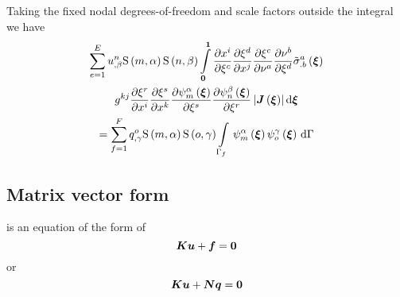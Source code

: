 Taking the fixed nodal degrees-of-freedom and scale factors outside the integral we have
\begin{multline}
  \dsum_{e=1}^{E}\nodedof{u}{n}{\beta}\gsf{m}{\alpha}\gsf{n}{\beta}
  \dintl{\vectr{0}}{\vectr{1}}\delby{x^{i}}{\xi^{c}}
  \delby{\xi^{d}}{x^{j}}\delby{\xi^{c}}{\nu^{a}}
  \delby{\nu^{b}}{\xi^{d}}\fnof{{\tilde{\conductivitytensorsymbol}}^{a}_{.b}}{\vectr{\xi}} \\
  \generalmetrictensorsymbol^{kj}\delby{\xi^{r}}{x^{i}}\delby{\xi^{s}}{x^{k}}
  \delby{\gbfn{m}{\alpha}{\vectr{\xi}}}{\xi^{s}}
  \delby{\gbfn{n}{\beta}{\vectr{\xi}}}{\xi^{r}}
  \abs{\fnof{\matr{J}}{\vectr{\xi}}}\exteriorderiv{\vectr{\xi}} \\
  = \dsum_{f=1}^{F}\nodedof{q}{o}{\gamma}\gsf{m}{\alpha}\gsf{o}{\gamma}
  \gint{\Gamma_{f}}{}{\gbfn{m}{\alpha}{\vectr{\xi}}\gbfn{o}{\gamma}{\vectr{\xi}}}{\Gamma}
  \label{eqn:elementalfem1}
\end{multline}

\subsection{Matrix vector form}

 is an equation of the form of
\begin{equation}
  \matr{K}\vect{u}+\vect{f}=\vect{0}
\end{equation}
or
\begin{equation}
  \matr{K}\vect{u}+\matr{N}\vectr{q}=\vect{0}
\end{equation}


